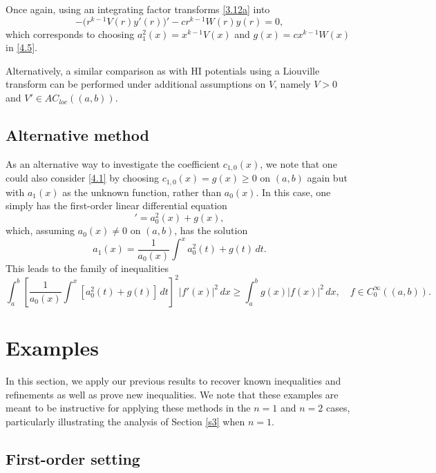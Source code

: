 \documentclass[reqno,10pt,centertags]{amsart}
\newcommand{\lb}{\label}
\numberwithin{equation}{section}
\theoremstyle{remark}
\begin{document}
Once again, using an integrating factor transforms \eqref{3.12a} into
\begin{equation}
-\big(r^{k-1} V(r) y'(r)\big)'-cr^{k-1} W(r) y(r)=0,
\end{equation}
which corresponds to choosing $a_1^2(x)=x^{k-1} V(x)$ and $g(x)=cx^{k-1} W(x)$ in \eqref{4.5}.

Alternatively, a similar comparison as with HI potentials using a Liouville transform can be performed under additional assumptions on $V$, namely $V>0$ and $V'\in AC_{loc}((a,b))$.

\subsection{Alternative method}
As an alternative way to investigate the coefficient $c_{1,0}(x)$, we note that one could also consider \eqref{4.1} by choosing $c_{1,0}(x)=g(x)\geq0$ on $(a,b)$ again but with $a_1(x)$ as the unknown function, rather than $a_0(x)$. In this case, one simply has the first-order linear differential equation
\begin{equation}
[a_0(x)a_1(x)]'=a_0^2(x)+g(x),
\end{equation}
which, assuming $a_0(x)\neq 0$ on $(a,b)$, has the solution
\begin{equation}
a_1(x)=\frac{1}{a_0(x)}\int^x a_0^2(t)+g(t)\, dt.
\end{equation}
This leads to the family of inequalities
\begin{equation}
\int_a^b \left[\frac{1}{a_0(x)}\int^x [a_0^2(t)+g(t)]\, dt\right]^2 |f'(x)|^2\, dx \geq \int_a^b g(x)|f(x)|^2\, dx,\quad f\in C^\infty_0((a,b)).
\end{equation}


\section{Examples}\lb{s4}

In this section, we apply our previous results to recover known inequalities and refinements as well as prove new inequalities. We note that these examples are meant to be instructive for applying these methods in the $n=1$ and $n=2$ cases, particularly illustrating the analysis of Section \ref{s3} when $n=1$.

\subsection{First-order setting}\lb{s5.1}
\end{document}
